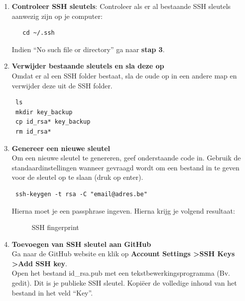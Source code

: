 \documentclass[12pt]{article} %
\begin{document}
\begin{enumerate}
 \item \textbf{Controleer SSH sleutels}: Controleer als er al bestaande SSH sleutels aanwezig zijn op je computer:
  \begin{lstlisting}
   cd ~/.ssh
  \end{lstlisting}
Indien ``No such file or directory'' ga naar \textbf{stap 3}.

\item \textbf{Verwijder bestaande sleutels en sla deze op} \\
Omdat er al een SSH folder bestaat, sla de oude op in een andere map en verwijder deze uit de SSH folder.

\begin{lstlisting}
 ls
 mkdir key_backup
 cp id_rsa* key_backup
 rm id_rsa*
\end{lstlisting}

\item \textbf{Genereer een nieuwe sleutel} \\
Om een nieuwe sleutel te genereren, geef onderstaande code in. Gebruik de standaardinstellingen wanneer gevraagd wordt om een bestand in te geven voor de sleutel op te slaan (druk op enter).
\begin{lstlisting}
 ssh-keygen -t rsa -C "email@adres.be"
\end{lstlisting}

Hierna moet je een passphrase ingeven. Hierna krijg je volgend resultaat:

\begin{figure}[H]
\caption{SSH fingerprint}
\label{fig:fingerprint}
\end{figure}

\item \textbf{Toevoegen van SSH sleutel aan GitHub} \\
Ga naar de GitHub website en klik op \textbf{Account Settings \textgreater \space SSH Keys \textgreater \space Add SSH key}.\\
Open het bestand id\_rsa.pub met een tekstbewerkingsprogramma (Bv. gedit). Dit is je publieke SSH sleutel.
Kopi\"eer de volledige inhoud van het bestand in het veld ``Key''.


\end{enumerate}
\end{document}
